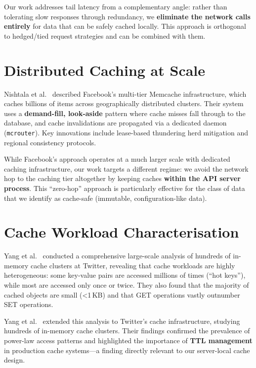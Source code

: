 \documentclass[12pt,a4paper]{report}
\begin{document}
Our work addresses tail latency from a complementary angle: rather than tolerating slow responses through redundancy, we \textbf{eliminate the network calls entirely} for data that can be safely cached locally. This approach is orthogonal to hedged/tied request strategies and can be combined with them.

\section{Distributed Caching at Scale}

Nishtala et al.~\cite{nishtala2013memcache} described Facebook's multi-tier Memcache infrastructure, which caches billions of items across geographically distributed clusters. Their system uses a \textbf{demand-fill, look-aside} pattern where cache misses fall through to the database, and cache invalidations are propagated via a dedicated daemon (\texttt{mcrouter}). Key innovations include lease-based thundering herd mitigation and regional consistency protocols.

While Facebook's approach operates at a much larger scale with dedicated caching infrastructure, our work targets a different regime: we avoid the network hop to the caching tier altogether by keeping caches \textbf{within the API server process}. This ``zero-hop'' approach is particularly effective for the class of data that we identify as cache-safe (immutable, configuration-like data).

\section{Cache Workload Characterisation}

Yang et al.~\cite{yang2020twitter} conducted a comprehensive large-scale analysis of hundreds of in-memory cache clusters at Twitter, revealing that cache workloads are highly heterogeneous: some key-value pairs are accessed millions of times (``hot keys''), while most are accessed only once or twice. They also found that the majority of cached objects are small (<1\,KB) and that GET operations vastly outnumber SET operations.

Yang et al.~\cite{yang2020twitter} extended this analysis to Twitter's cache infrastructure, studying hundreds of in-memory cache clusters. Their findings confirmed the prevalence of power-law access patterns and highlighted the importance of \textbf{TTL management} in production cache systems—a finding directly relevant to our server-local cache design.
\end{document}

